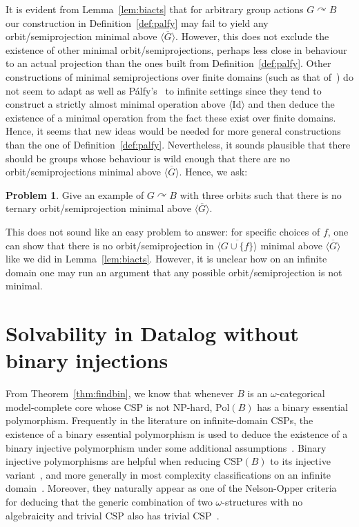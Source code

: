 \documentclass{article}
\theoremstyle{remark}
\theoremstyle{definition}
\newtheorem{prob}[theorem]{Problem}
\def\acts{\curvearrowright}
\begin{document}
It is evident from Lemma~\ref{lem:biacts} that for arbitrary group actions $G\acts B$ our construction in Definition~\ref{def:palfy} may fail to yield any orbit\-/semiprojection minimal above $\overline{\langle G\rangle}$. However, this does not exclude the existence of other minimal orbit\-/semiprojections, perhaps less close in behaviour to an actual projection than the ones built from Definition~\ref{def:palfy}. Other constructions of minimal semiprojections over finite domains (such as that of~\cite{lengvarszky1986note}) do not seem to adapt as well as 
P\'{a}lfy's~\cite{palfy1986arity} to infinite settings since they tend to construct a strictly almost minimal operation above $\langle\mathrm{Id}\rangle$ and then deduce the existence of a minimal operation from the fact these exist over finite domains. Hence, it seems that new ideas would be needed for more general constructions than the one of Definition~\ref{def:palfy}. Nevertheless, it sounds plausible that there should be groups whose behaviour is wild enough that there are no orbit\-/semiprojections minimal above $\overline{\langle G\rangle}$. Hence, we ask:


\begin{prob} Give an example of $G\acts B$ with three orbits such that there is no ternary orbit\-/semiprojection minimal above $\overline{\langle G\rangle}$. 
\end{prob}

This does not sound like an easy problem to answer: for specific choices of $f$, one can show that there is no orbit\-/semiprojection in $\overline{\langle G\cup\{f\}\rangle}$ minimal above $\overline{\langle G\rangle}$ like we did in Lemma~\ref{lem:biacts}. However, it is unclear how on an infinite domain one may run an argument that any possible orbit\-/semiprojection is not minimal.



\section{Solvability in Datalog without binary injections}\label{sec:datalog}

From Theorem~\ref{thm:findbin}, we know that whenever $B$ is an $\omega$-categorical model-complete core whose $\mathrm{CSP}$ is not $\mathrm{NP}$-hard, $\mathrm{Pol}(B)$ has a binary essential polymorphism. Frequently in the literature on infinite-domain $\mathrm{CSP}$s, the existence of a binary essential polymorphism is used to deduce the existence of a binary injective polymorphism under some additional assumptions~\cite{BodKara, bodirsky2010complexity, minrandom, Smoothapp, bodirsky2020complexity}. Binary injective polymorphisms are  helpful when reducing $\mathrm{CSP}(B)$ to its injective variant~\cite{Smoothapp}, and more generally in most complexity classifications on an infinite domain~\cite{bodirsky2010complexity, minrandom, Smoothapp}. Moreover, they naturally appear as one of the Nelson-Opper criteria~\cite{nelson1979simplification} for deducing that the generic combination of two $\omega$-structures with no algebraicity and trivial $\mathrm{CSP}$ also has trivial $\mathrm{CSP}$~\cite{bodirsky2020complexity, bodirsky2022tractable}.\\
\end{document}
